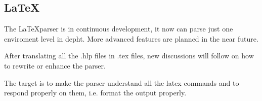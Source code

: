 \subsection{\LaTeX}
The \LaTeX  parser is in continuous development, it now can parse just one 
enviroment level in depht. More advanced features are planned in the near
future.

After translating all the .hlp files in .tex files, new discussions will
follow on how to rewrite or enhance the parser.

The target is to make the parser understand all the latex commands and to 
respond properly on them, i.e. format the output properly.
